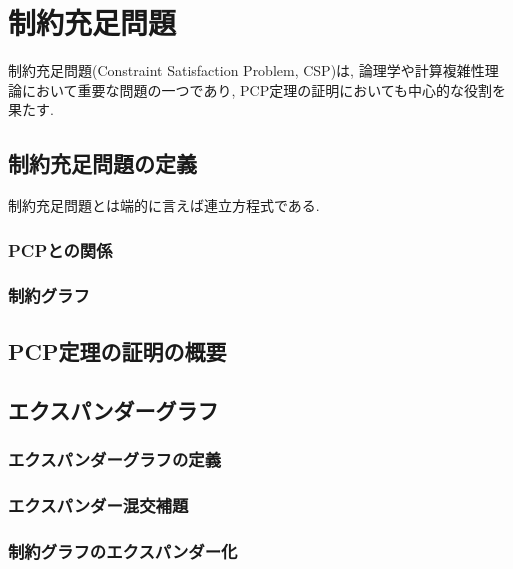 \chapter{制約充足問題} \label{chap:CSP}
制約充足問題(Constraint Satisfaction Problem, CSP)は, 論理学や計算複雑性理論において重要な問題の一つであり,
PCP定理の証明においても中心的な役割を果たす.

\section{制約充足問題の定義}
制約充足問題とは端的に言えば連立方程式である.

\subsection{PCPとの関係}
\subsection{制約グラフ}

\section{PCP定理の証明の概要}

\section{エクスパンダーグラフ}
\subsection{エクスパンダーグラフの定義}
\subsection{エクスパンダー混交補題}
\subsection{制約グラフのエクスパンダー化}